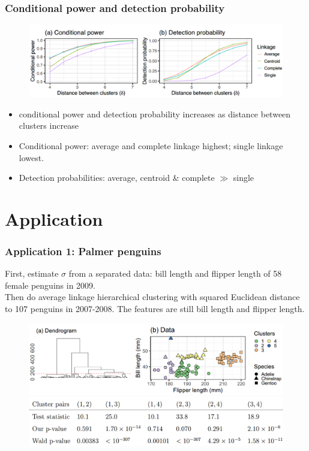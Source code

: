 \documentclass{beamer}
\begin{document}
	
	\begin{frame}
		\frametitle{Conditional power and detection probability}
		\begin{figure}
			\includegraphics[width=1\linewidth]{image027.png}
		\end{figure}
		\begin{itemize}
			\item 
			conditional power and detection probability increases as distance between clusters increase
			\item
			Conditional power: average and complete linkage highest; single linkage lowest.
			\item
			Detection probabilities: average, centroid \& complete $\gg$ single
		\end{itemize}
	\end{frame}
	
	\section{Application}
	\begin{frame}
		\frametitle{Application 1: Palmer penguins}
		First, estimate $\sigma$ from a separated data: bill length and flipper length of 58 female penguins in 2009.\\
		Then do average linkage hierarchical clustering with squared Euclidean distance to 107 penguins in 2007-2008. The features are still bill length and flipper length. 
		\begin{figure}
			\includegraphics[width=.8\linewidth]{image028.png}
			\includegraphics[width=.8\linewidth]{image029.png}
		\end{figure}
	\end{frame}
	
\end{document}
